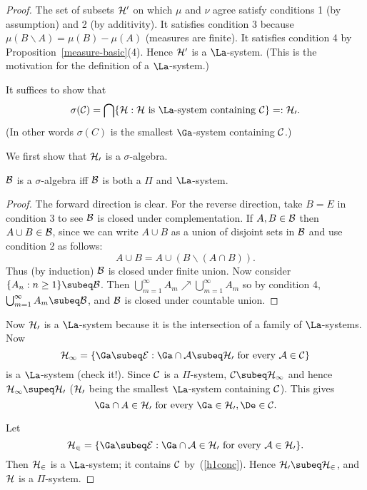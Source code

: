 \begin{proof}
The set of subsets $\cal H'$ on which $\mu$ and $\nu$ agree satisfy conditions 1 (by assumption) and 2 (by additivity). It satisfies condition 3 because $\mu(B\backslash A)=\mu(B)-\mu(A)$ (measures are finite). It satisfies condition 4 by Proposition~\ref{measure-basic}(4). Hence $\cal H'$ is a $\La$-system. (This is the motivation for the definition of a $\La$-system.)

It suffices to show that 
\[\sigma(\cal C)=\bigcap\{\cal H:\cal H\text{ is }\La\text{-system containing }\cal C\}=:\cal H_0.\]
(In other words $\sigma(C)$ is the smallest $\Ga$-system containing $\cal C$.)

We first show that $\cal H_0$ is a $\sigma$-algebra.
\begin{lem}\label{pila}
$\cal B$ is a $\sigma$-algebra iff $\cal B$ is both a $\Pi$ and $\La$-system. 
\end{lem}
\begin{proof}
The forward direction is clear. For the reverse direction, take $B=E$ in condition 3 to see $\cal B$ is closed under complementation. If $A,B\in \cal B$ then $A\cup B\in \cal B$, since we can write $A\cup B$ as a union of disjoint sets in $\cal B$ and use condition 2 as follows:
\[
A\cup B=A\cup (B\backslash (A\cap B)).
\]
Thus (by induction) $\cal B$ is closed under finite union.
Now consider $\{A_n:n\geq 1\}\subeq \cal B$. Then $\bigcup_{m=1}^{\infty} A_m\nearrow \bigcup_{m=1}^{\infty} A_m$ so by condition 4, $\bigcup_{m=1}^{\infty} A_m\subeq \cal B$, and $\cal B$ is closed under countable union.
\end{proof}
Now $\cal H_0$ is a $\La$-system because it is the intersection of a family of $\La$-systems. Now
\[
\cal H_1=\{\Ga\subeq E:
\Ga\cap A\subeq \cal H_0\text{ for every } A\in \cal C\}
\]
is a $\La$-system (check it!). Since $\cal C$ is a $\Pi$-system, $\cal C\subeq \cal H_1$ and hence $\cal H_1\supeq \cal H_0$ ($\cal H_0$ being the smallest $\La$-system containing $\cal C$). This gives
\begin{equation}\label{h1conc}
\Ga\cap A\in \cal H_0 \text{ for every }\Ga\in \cal H_0,\De\in \cal C.
\end{equation}

Let
\[
\cal H_2=\{\Ga\subeq E: \Ga\cap A\in \cal H_0\text{ for every }A\in \cal H_0\}.
\]
Then $\cal H_2$ is a $\La$-system; it contains $\cal C$ by~(\ref{h1conc}). Hence $\cal H_0\subeq \cal H_2$, and $\cal H$ is a $\Pi$-system.
\end{proof}
